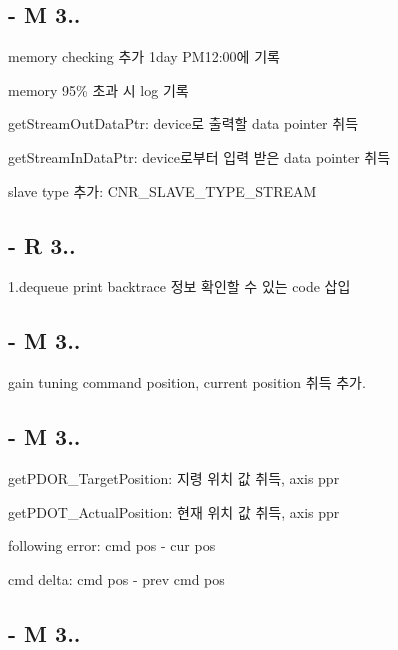 \subsection*{-\/ M 3..}


\begin{DoxyEnumerate}
\item memory checking 추가 1day P\-M12\-:00에 기록
\item memory 95\% 초과 시 log 기록
\item get\-Stream\-Out\-Data\-Ptr\-: device로 출력할 data pointer 취득
\item get\-Stream\-In\-Data\-Ptr\-: device로부터 입력 받은 data pointer 취득
\item slave type 추가\-: C\-N\-R\-\_\-\-S\-L\-A\-V\-E\-\_\-\-T\-Y\-P\-E\-\_\-\-S\-T\-R\-E\-A\-M
\end{DoxyEnumerate}

\subsection*{-\/ R 3..}

1.\-dequeue print backtrace 정보 확인할 수 있는 code 삽입

\subsection*{-\/ M 3..}


\begin{DoxyEnumerate}
\item gain tuning command position, current position 취득 추가.
\end{DoxyEnumerate}

\subsection*{-\/ M 3..}


\begin{DoxyEnumerate}
\item get\-P\-D\-O\-R\-\_\-\-Target\-Position\-: 지령 위치 값 취득, axis ppr
\item get\-P\-D\-O\-T\-\_\-\-Actual\-Position\-: 현재 위치 값 취득, axis ppr
\item following error\-: cmd pos -\/ cur pos
\item cmd delta\-: cmd pos -\/ prev cmd pos
\end{DoxyEnumerate}

\subsection*{-\/ M 3..}


